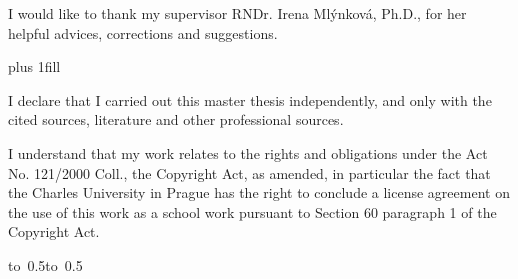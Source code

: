 \documentclass[12pt,a4paper]{report}
\let\openright=\clearpage
\begin{document}
\newpage



\openright

\noindent
I would like to thank my supervisor RNDr. Irena Mlýnková, Ph.D., for her helpful advices, corrections and suggestions.

\newpage


\vglue 0pt plus 1fill

\noindent
I declare that I carried out this master thesis independently, and only with the cited
sources, literature and other professional sources.

\medskip\noindent
I understand that my work relates to the rights and obligations under the Act No.
121/2000 Coll., the Copyright Act, as amended, in particular the fact that the Charles
University in Prague has the right to conclude a license agreement on the use of this
work as a school work pursuant to Section 60 paragraph 1 of the Copyright Act.

\vspace{10mm}

\hbox{\hbox to 0.5\hbox to 0.5}

\vspace{20mm}
\newpage

\end{document}
